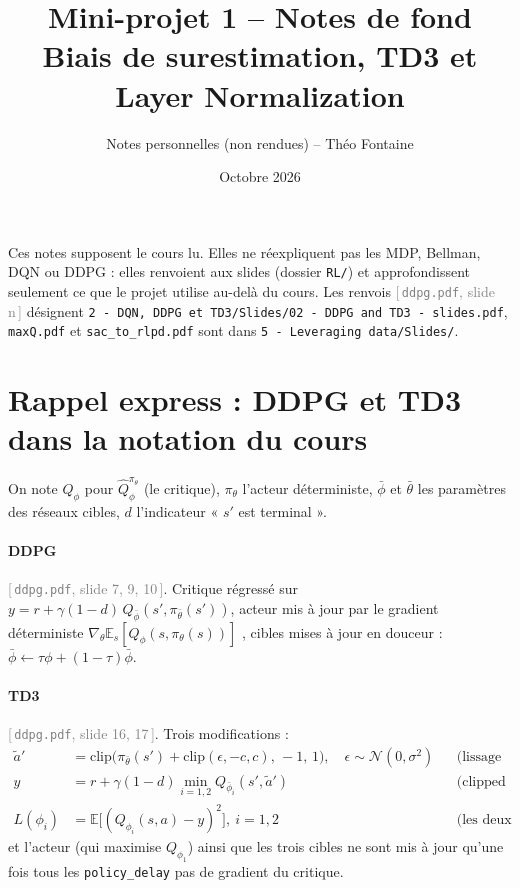 \documentclass[11pt,a4paper]{article}
\title{Mini-projet 1 -- Notes de fond\\\large Biais de surestimation, TD3 et Layer Normalization}
\author{Notes personnelles (non rendues) -- Théo Fontaine}
\date{Octobre 2026}
\newcommand{\E}{\mathbb{E}}
\newcommand{\code}[1]{\texttt{#1}}
\newcommand{\slide}[2]{\textcolor{gray}{[\,\code{#1}, slide #2\,]}}
\begin{document}
\maketitle

\noindent Ces notes supposent le cours lu. Elles ne réexpliquent pas les MDP, Bellman, DQN ou DDPG :
elles renvoient aux slides (dossier \code{RL/}) et approfondissent seulement ce que le projet utilise
au-delà du cours. Les renvois \slide{ddpg.pdf}{n} désignent
\code{2 - DQN, DDPG et TD3/Slides/02 - DDPG and TD3 - slides.pdf}, \code{maxQ.pdf} et
\code{sac\_to\_rlpd.pdf} sont dans \code{5 - Leveraging data/Slides/}.

\tableofcontents

\section{Rappel express : DDPG et TD3 dans la notation du cours}

On note $Q_\phi$ pour $\hat Q^{\pi_\theta}_\phi$ (le critique), $\pi_\theta$ l'acteur déterministe,
$\bar\phi$ et $\bar\theta$ les paramètres des réseaux cibles, $d$ l'indicateur « $s'$ est terminal ».

\paragraph{DDPG} \slide{ddpg.pdf}{7, 9, 10}. Critique régressé sur
$y = r + \gamma(1-d)\,Q_{\bar\phi}(s', \pi_{\bar\theta}(s'))$, acteur mis à jour par le gradient
déterministe $\nabla_\theta \E_s[Q_\phi(s,\pi_\theta(s))]$ \citep{silver2014dpg}, cibles mises à jour
en douceur : $\bar\phi \leftarrow \tau\phi + (1-\tau)\bar\phi$.

\paragraph{TD3} \slide{ddpg.pdf}{16, 17}. Trois modifications \citep{fujimoto2018td3} :
\begin{align}
  \tilde a' &= \mathrm{clip}\big(\pi_{\bar\theta}(s') + \mathrm{clip}(\epsilon,-c,c),\,-1,\,1\big),
     \quad \epsilon\sim\mathcal N(0,\sigma^2) && \text{(lissage de la politique cible)}\\
  y &= r + \gamma(1-d)\min_{i=1,2} Q_{\bar\phi_i}(s', \tilde a') && \text{(clipped double-Q)}\\
  L(\phi_i) &= \E\big[(Q_{\phi_i}(s,a) - y)^2\big],\ i=1,2 && \text{(les deux critiques, même cible)}
\end{align}
et l'acteur (qui maximise $Q_{\phi_1}$) ainsi que les trois cibles ne sont mis à jour qu'une fois
tous les \code{policy\_delay} pas de gradient du critique.
\end{document}
